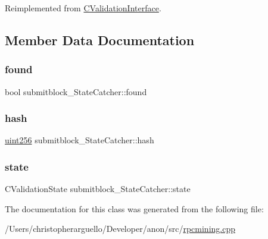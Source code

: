 Reimplemented from \mbox{\hyperlink{class_c_validation_interface_aeb34ef6814685cabc29062ed7be25441}{C\+Validation\+Interface}}.



\subsection{Member Data Documentation}
\mbox{\label{classsubmitblock___state_catcher_a61c0d03544cd4495534bdb0b52f36886}} 
\subsubsection{\texorpdfstring{found}{found}}
{\footnotesize\ttfamily bool submitblock\+\_\+\+State\+Catcher\+::found}

\mbox{\label{classsubmitblock___state_catcher_adcc822af0b1305bcda71f8e9656c4239}} 
\subsubsection{\texorpdfstring{hash}{hash}}
{\footnotesize\ttfamily \mbox{\hyperlink{classuint256}{uint256}} submitblock\+\_\+\+State\+Catcher\+::hash}

\mbox{\label{classsubmitblock___state_catcher_a78357802ab8d143f6f21929e0aa2d727}} 
\subsubsection{\texorpdfstring{state}{state}}
{\footnotesize\ttfamily C\+Validation\+State submitblock\+\_\+\+State\+Catcher\+::state}



The documentation for this class was generated from the following file\+:\begin{DoxyCompactItemize}
\item 
/\+Users/christopherarguello/\+Developer/anon/src/\mbox{\hyperlink{rpcmining_8cpp}{rpcmining.\+cpp}}\end{DoxyCompactItemize}
